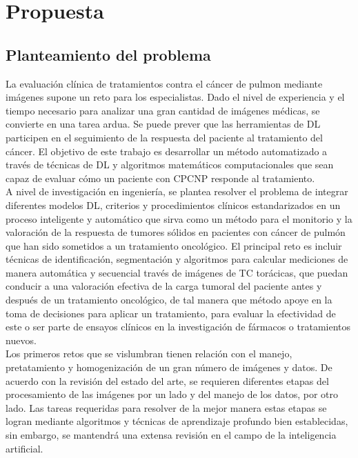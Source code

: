 \documentclass[11pt,a4paper,openany]{article}
\begin{document}
\section{Propuesta}

    \subsection{Planteamiento del problema}
    La evaluación clínica de tratamientos contra el cáncer de pulmon mediante imágenes supone un reto para los especialistas. Dado el nivel de experiencia y el tiempo necesario para analizar una gran cantidad de imágenes médicas, se convierte en una tarea ardua. Se puede prever que las herramientas de DL participen en el seguimiento de la respuesta del paciente al tratamiento del cáncer. El objetivo de este trabajo es desarrollar un método automatizado a través de técnicas de DL y algoritmos matemáticos computacionales que sean capaz de evaluar cómo un paciente con CPCNP responde al tratamiento.\\
    
    A nivel de investigación en ingeniería, se plantea resolver el problema de integrar diferentes modelos DL, criterios y procedimientos clínicos estandarizados en un proceso inteligente y automático que sirva como un método para el monitorio y la valoración de la respuesta de tumores sólidos en pacientes con cáncer de pulmón que han sido sometidos a un tratamiento oncológico. El principal reto es incluir técnicas de identificación, segmentación y algoritmos para calcular mediciones de manera automática y secuencial través de imágenes de TC torácicas, que puedan conducir a una valoración efectiva de la carga tumoral del paciente antes y después de un tratamiento oncológico, de tal manera que método apoye en la toma de decisiones para aplicar un tratamiento, para evaluar la efectividad de este o ser parte de ensayos clínicos en la investigación de fármacos o tratamientos nuevos.\\

    Los primeros retos que se vislumbran tienen relación con el manejo, pretatamiento y homogenización de un gran número de imágenes y datos. De acuerdo con la revisión del estado del arte, se requieren diferentes etapas del procesamiento de las imágenes por un lado y del manejo de los datos, por otro lado. Las tareas requeridas para resolver de la mejor manera estas etapas se logran mediante algoritmos y técnicas de aprendizaje profundo bien establecidas, sin embargo, se mantendrá una extensa revisión en el campo de la inteligencia artificial.\\
\end{document}
